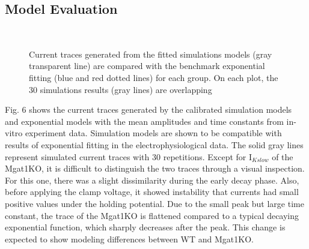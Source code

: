\documentclass[journal]{IEEEtran}
\begin{document}
\subsection{Model Evaluation}
\begin{figure}
    \label{}
    \centering
    \\
    \caption{Current traces generated from the fitted simulations models (gray transparent line) are compared with the benchmark exponential fitting (blue and red dotted lines) for each group. On each plot, the 30 simulations results (gray lines) are overlapping}
\end{figure}
Fig. 6 shows the current traces generated by the calibrated simulation models and exponential models with the mean amplitudes and time constants from in-vitro experiment data. Simulation models are shown to be compatible with results of exponential fitting in the electrophysiological data. The solid gray lines represent simulated current traces with 30 repetitions. Except for $\text{I}_{Kslow}$ of the Mgat1KO, it is difficult to distinguish the two traces through a visual inspection. For this one, there was a slight dissimilarity during the early decay phase. Also, before applying the clamp voltage, it showed instability that currents had small positive values under the holding potential. Due to the small peak but large time constant, the trace of the Mgat1KO is flattened compared to a typical decaying exponential function, which sharply decreases after the peak. This change is expected to show modeling differences between WT and Mgat1KO.
\end{document}

